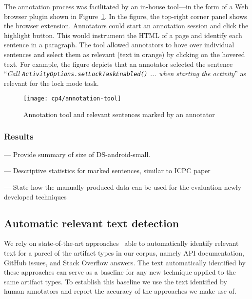 The annotation process was facilitated by an in-house tool---in the form of a Web browser plugin shown in Figure~\ref{fig:corpus-annotation-tool}. In the figure, the top-right corner panel shows the browser extension. Annotators could start an annotation session and click the highlight button.
This would instrument the HTML of a page and identify each sentence in a paragraph. The tool allowed annotators to hove over individual sentences and select them as relevant (text in orange) by clicking on the hovered text. For example, the figure depicts that an annotator selected  the sentence
``\textit{Call {\small \texttt{ActivityOptions.setLockTaskEnabled()}} ... when starting the activity}'' as relevant for the lock mode task.


\begin{figure}
    \centering
    \texttt{[image: cp4/annotation-tool]}
    \caption{Annotation tool and relevant sentences marked by an annotator}
    \label{fig:corpus-annotation-tool}
\end{figure}


\subsubsection{Results}

--- Provide summary of size of \acs{DS-android-small}. 

--- Descriptive statistics for marked sentences, similar to ICPC paper

--- State how the manually produced data can be used for the evaluation newly developed
techniques




\subsection{Automatic relevant text detection}
\label{cp4:relevant-text-auto}





We rely on state-of-the-art approaches~\cite{nadi2020, Robillard2015, Lotufo2012, Xu2017} able to automatically identify relevant text for a parcel of the  artifact types in our corpus, namely API documentation, GitHub issues, and Stack Overflow answers.
The text automatically identified by these approaches can serve as a baseline for 
any new technique applied to the same artifact types. 
To establish this baseline we use the text identified by human annotators and report the accuracy of the approaches we make use of.


